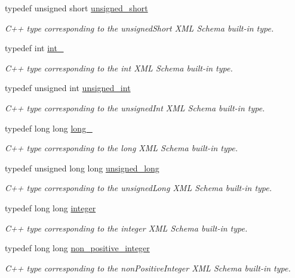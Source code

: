 \begin{DoxyCompactItemize}
typedef unsigned short \hyperlink{namespacexml__schema_a7fc7b4a846c512c370346e15dfdcecaa}{unsigned\+\_\+short}
\begin{DoxyCompactList}\small\item\em C++ type corresponding to the unsigned\+Short X\+M\+L Schema built-\/in type. \end{DoxyCompactList}\item 
typedef int \hyperlink{namespacexml__schema_acfa24ac68e1a188e7f44c36f7a158bf4}{int\+\_\+}
\begin{DoxyCompactList}\small\item\em C++ type corresponding to the int X\+M\+L Schema built-\/in type. \end{DoxyCompactList}\item 
typedef unsigned int \hyperlink{namespacexml__schema_a85ca3205d8af287e149aac54535f57e7}{unsigned\+\_\+int}
\begin{DoxyCompactList}\small\item\em C++ type corresponding to the unsigned\+Int X\+M\+L Schema built-\/in type. \end{DoxyCompactList}\item 
typedef long long \hyperlink{namespacexml__schema_a1d78aacee49e26cb7a69d5aa97df1268}{long\+\_\+}
\begin{DoxyCompactList}\small\item\em C++ type corresponding to the long X\+M\+L Schema built-\/in type. \end{DoxyCompactList}\item 
typedef unsigned long long \hyperlink{namespacexml__schema_a4413fbcf4c65ffc7aaafe465d72fcb33}{unsigned\+\_\+long}
\begin{DoxyCompactList}\small\item\em C++ type corresponding to the unsigned\+Long X\+M\+L Schema built-\/in type. \end{DoxyCompactList}\item 
typedef long long \hyperlink{namespacexml__schema_aaaea7c8ce4dfbe26cc52c91c29c97b7c}{integer}
\begin{DoxyCompactList}\small\item\em C++ type corresponding to the integer X\+M\+L Schema built-\/in type. \end{DoxyCompactList}\item 
typedef long long \hyperlink{namespacexml__schema_a3de6073e510eb8edd71ddc6e0256e2f9}{non\+\_\+positive\+\_\+integer}
\begin{DoxyCompactList}\small\item\em C++ type corresponding to the non\+Positive\+Integer X\+M\+L Schema built-\/in type. \end{DoxyCompactList}\item 

\end{DoxyCompactItemize}
